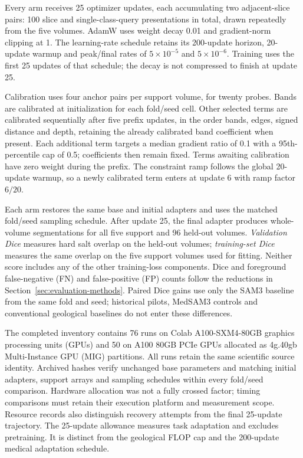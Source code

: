 \documentclass[12pt,a4paper]{article}
\begin{document}
Every arm receives 25 optimizer updates, each accumulating two
adjacent-slice pairs: 100 slice and single-class-query presentations in
total, drawn repeatedly from the five volumes. AdamW uses weight decay
0.01 and gradient-norm clipping at 1. The learning-rate schedule retains
its 200-update horizon, 20-update warmup and peak/final rates of
$5\times10^{-5}$ and $5\times10^{-6}$. Training uses the first 25 updates
of that schedule; the decay is not compressed to finish at update 25.

Calibration uses four anchor pairs per support volume, for twenty
probes. Bands are calibrated at initialization for each fold/seed cell.
Other selected terms are calibrated sequentially after five prefix
updates, in the order bands, edges, signed distance and depth, retaining
the already calibrated band coefficient when present. Each additional
term targets a median gradient ratio of 0.1 with a 95th-percentile cap
of 0.5; coefficients then remain fixed. Terms awaiting calibration have
zero weight during the prefix. The constraint ramp follows the global
20-update warmup, so a newly calibrated term enters at update 6 with
ramp factor $6/20$.


Each arm restores the same base and initial adapters and uses the matched
fold/seed sampling schedule. After update 25, the final adapter produces
whole-volume segmentations for all five support and 96 held-out volumes.
\emph{Validation Dice} measures hard salt overlap on the held-out
volumes; \emph{training-set Dice} measures the same overlap on the five
support volumes used for fitting. Neither score includes any of the
other training-loss components. Dice and foreground false-negative (FN) and false-positive (FP) counts follow the
reductions in Section~\ref{sec:evaluation-methods}. Paired Dice gains
use only the SAM3 baseline from the same fold and seed;
historical pilots, MedSAM3 controls and conventional geological
baselines do not enter these differences.

The completed inventory contains 76 runs on Colab A100-SXM4-80GB
graphics processing units (GPUs) and 50 on A100 80GB PCIe GPUs allocated as 4g.40gb Multi-Instance GPU (MIG) partitions.
All runs retain the same scientific source identity. Archived hashes
verify unchanged base parameters and matching initial adapters, support
arrays and sampling schedules within every fold/seed comparison.
Hardware allocation was not a fully crossed factor; timing comparisons
must retain their execution platform and measurement scope.
Resource records also distinguish recovery attempts from the final
25-update trajectory. The 25-update allowance
measures task adaptation and excludes pretraining. It is distinct from the geological FLOP cap
and the 200-update medical adaptation schedule.
\end{document}
